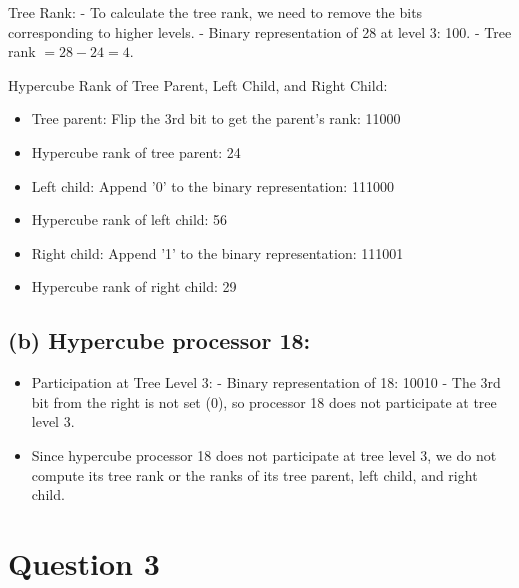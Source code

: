 \documentclass{article}
\begin{document}
Tree Rank:
- To calculate the tree rank, we need to remove the bits corresponding to higher levels.
- Binary representation of 28 at level 3: 100.
- Tree rank $=28-24=4$.

Hypercube Rank of Tree Parent, Left Child, and Right Child:
\begin{itemize}
    \item Tree parent: Flip the 3rd bit to get the parent's rank: 11000
    \item Hypercube rank of tree parent: 24
    \item Left child: Append '0' to the binary representation: 111000
    \item Hypercube rank of left child: 56
    \item Right child: Append '1' to the binary representation: 111001
    \item Hypercube rank of right child: 29

\end{itemize}
\subsection{(b) Hypercube processor 18:}

\begin{itemize}
    \item Participation at Tree Level 3:
- Binary representation of 18: 10010
- The 3rd bit from the right is not set (0), so processor 18 does not participate at tree level 3.
\item Since hypercube processor 18 does not participate at tree level 3, we do not compute its tree rank or the ranks of its tree parent, left child, and right child.
\end{itemize}
\section{Question 3}
\end{document}
